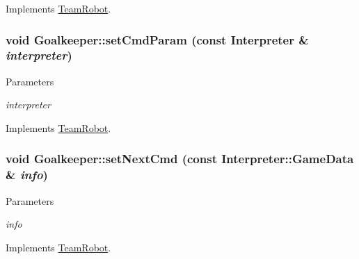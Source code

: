 Implements \hyperlink{classTeamRobot_a9b84df51ca16a7203fdb6498ea6741da}{TeamRobot}.

\hypertarget{classGoalkeeper_acfa6fbad0f6b1627fd59cc7cce6ff321}{
\subsubsection[{setCmdParam}]{\setlength{\rightskip}{0pt plus 5cm}void Goalkeeper::setCmdParam (const {\bf Interpreter} \& {\em interpreter})}}
\label{classGoalkeeper_acfa6fbad0f6b1627fd59cc7cce6ff321}

\begin{DoxyParams}{Parameters}
\item[{\em interpreter}]\end{DoxyParams}


Implements \hyperlink{classTeamRobot_a34c0fd6986c510d4025e5752b3c0e49a}{TeamRobot}.

\hypertarget{classGoalkeeper_abc394351f7c0d552c6e96da422c772ec}{
\subsubsection[{setNextCmd}]{\setlength{\rightskip}{0pt plus 5cm}void Goalkeeper::setNextCmd (const {\bf Interpreter::GameData} \& {\em info})}}
\label{classGoalkeeper_abc394351f7c0d552c6e96da422c772ec}

\begin{DoxyParams}{Parameters}
\item[{\em info}]\end{DoxyParams}


Implements \hyperlink{classTeamRobot_a65f9a2b7464dfac3f4a0336810cf574f}{TeamRobot}.



